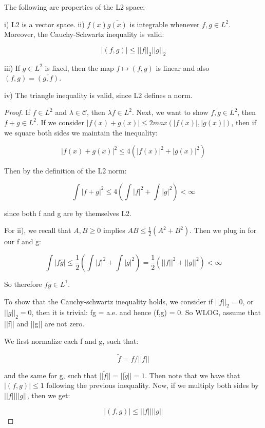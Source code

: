 \documentclass[class=article, crop=false]{standalone}
\begin{document}
		\begin{proposition}
			The following are properties of the L2 space:

			i) L2 is a vector space.
			ii) $f(x) \bar{g(x)}$ is integrable whenever $f, g \in L^2$. Moreover, the Cauchy-Schwartz inequality is valid:

				$$|(f,g)| \le ||f||_2 ||g||_2$$

			iii) If $g \in L^2$ is fixed, then the map $f \mapsto (f, g)$ is linear and also $(f, g) = \bar{(g, f)}$. 

			iv) The triangle inequality is valid, since L2 defines a norm.
		\end{proposition}
		\begin{proof}
			If $f \in L^2$ and $\lambda \in \mathcal{C}$, then $\lambda f \in L^2$. Next, we want to show $f, g \in L^2$, then $f + g \in L^2$. If we consider $|f(x) + g(x)| \le 2 max(|f(x)|, |g(x)|)$, then if we square both sides we maintain the inequality:

				$$|f(x) + g(x)|^2 \le 4 (|f(x)|^2 + |g(x)|^2)$$

			Then by the definition of the L2 norm:

				$$\int |f+g|^2 \le 4 ( \int |f|^2 + \int |g|^2) < \infty$$

			since both f and g are by themselves L2.

			For ii), we recall that $A, B \ge 0$ implies $AB \le \frac{1}{2} (A^2 + B^2)$. Then we plug in for our f and g:

				$$\int |f\bar{g}| \le \frac{1}{2} ( \int|f|^2 + \int|g|^2) = \frac{1}{2}(||f||^2 + ||g||^2) < \infty$$

			So therefore $f \bar{g} \in L^1$. 

			To show that the Cauchy-schwartz inequality holds, we consider if $||f||_2 = 0$, or $||g||_2 = 0$, then it is trivial: fg =  a.e. and hence (f,g) = 0. So WLOG, assume that ||f|| and ||g|| are not zero. 

			We first normalize each f and g, such that:

				$$\tilde{f} = f / ||f||$$

			and the same for g, such that $||\tilde{f}|| = ||\tilde{g}|| = 1$. Then note that we have that $|(f, g)| \le 1$ following the previous inequality. Now, if we multiply both sides by $||f||||g||$, then we get:

				$$|(f,g)| \le ||f||||g||$$
		\end{proof}
\end{document}
